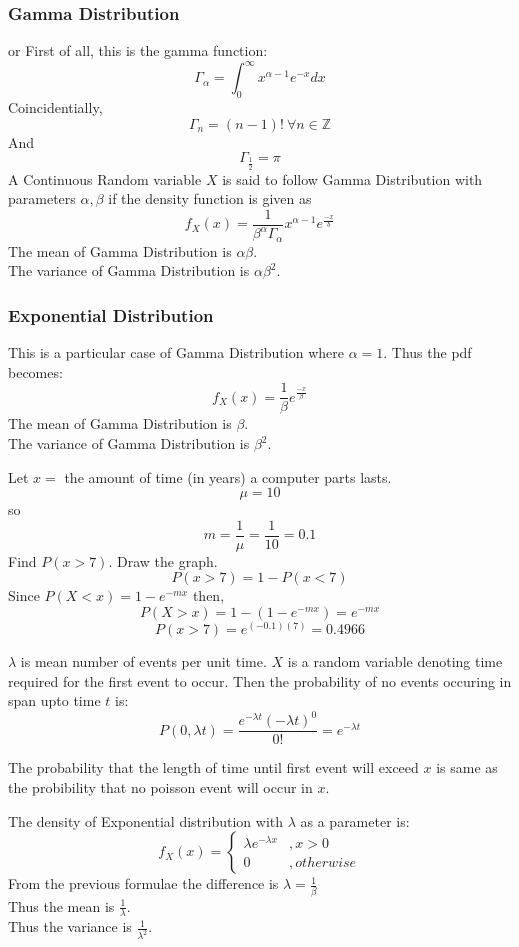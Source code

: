\documentclass[11pt,letterpaper]{article}
\begin{document}
\subsubsection{Gamma Distribution}or
First of all, this is the gamma function:
\[
  \Gamma_\alpha = \int_0^\infty x^{\alpha-1}e^{-x} dx
\]
Coincidentially, 
\[
  \Gamma_n = (n-1)! \ \forall n \in \mathbb{Z}
\]
And 
\[
  \Gamma_\frac{1}{2} = \pi
\]
A Continuous Random variable $X$ is said to follow Gamma Distribution with parameters
$\alpha,\beta$ if the density function is given as 
\[
  f_X(x) = \frac{1}{\beta^\alpha \Gamma_\alpha} x^{\alpha-1} e^{\frac{-x}{b}}
\]
The mean of Gamma Distribution is $\alpha\beta$. \\
The variance of Gamma Distribution is $\alpha\beta^2$.
\subsubsection{Exponential Distribution}
This is a particular case of Gamma Distribution where $\alpha = 1$. Thus the pdf
becomes: 
\[
  f_X(x) = \frac{1}{\beta} e^\frac{-x}{\beta}
\]
The mean of Gamma Distribution is $\beta$. \\
The variance of Gamma Distribution is $\beta^2$.
\vspace{1cm}
\begin{mdframed}
  Let $x = $ the amount of time (in years) a computer parts lasts. 
  \[
    \mu = 10
  \]
  so 
  \[
    m = \frac{1}{\mu} = \frac{1}{10} = 0.1
  \]
  Find 
  $P(x > 7).$ Draw the graph.
  \[ 
    P(x > 7) = 1 - P (x<7)
  \]
  Since $P(X<x)=1-e^{-mx}$ then, 
  \[
  P(X>x)=1-(1-e^{-mx})=e^{-mx}\]
  \[  
  P(x>7)=e^{(-0.1)(7)}=0.4966
    \]
\end{mdframed}

$\lambda$ is mean number of events per unit time. $X$ is a random variable denoting 
time required for the first event to occur. Then the probability of no events 
occuring in span upto time $t$ is: 
\[
  P(0, \lambda t) = \frac{e^{-\lambda t}(-\lambda t)^0}{0!} = e^{-\lambda t}
\]

The probability that the length of time until first event will exceed $x$ is same 
as the probibility that no poisson event will occur in $x$.

The density of Exponential distribution with $\lambda$ as a parameter is: 
\[
  f_X(x) = \begin{cases} \lambda e^{-\lambda x} &, x > 0\\ 
  0 &, otherwise\end{cases}
\]
From the previous formulae the difference is $\lambda = \frac{1}{\beta}$\\
Thus the mean is $\frac{1}{\lambda}$.\\
Thus the variance is $\frac{1}{\lambda^2}$.
\end{document}

